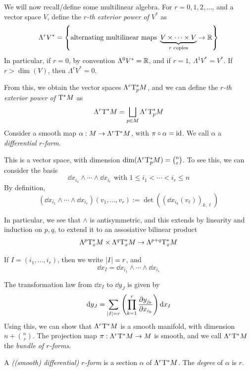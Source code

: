 \documentclass{article}
\begin{document}
We will now recall/define some multilinear algebra. For \(r = 0,1, 2, \dots\), and a vector space \(V\), define the \emph{\(r\)-th exterior power of \(V^*\)} as
\[\Lambda^rV^* = \left\{\text{alternating multilinear maps }\underbrace{V \times \cdots \times V}_{r \text{ copies}} \to \mathbb{R}\right\}\]
In particular, if \(r = 0\), by convention \(\Lambda^0V^* = \mathbb{R}\), and if \(r = 1\), \(\Lambda^1V^* = V^*\). If \(r > \dim(V)\), then \(\Lambda^rV^* = 0\). 

From this, we obtain the vector spaces \(\Lambda^r\mathrm{T}_p^* M\), and we can define the \emph{\(r\)-th exterior power of \(\mathrm{T}^*M\)} as
\[\Lambda^r\mathrm{T}^* M = \bigsqcup_{p \in M}\Lambda^r\mathrm{T}_p^* M\]
Consider a smooth map \(\alpha : M \to \Lambda^r\mathrm{T}^*M\), with \(\pi \circ \alpha = \operatorname{id}\). We call \(\alpha\) a \emph{differential \(r\)-form}.

\lec

This is a vector space, with dimension \(\dim(\Lambda^r\mathrm{T}_p^* M) = {n \choose r}\). To see this, we can consider the basis
\[\dd x_{i_1} \wedge \cdots \wedge \dd x_{i_r} \text{ with }1 \le i_1 < \cdots < i_r \le n\]
By definition,
\[(\dd x_{i_1} \wedge \cdots \wedge \dd x_{i_r})(v_1, \dots, v_r) := \det((\dd x_{i_k}(v_\ell))_{k, \ell})\]

In particular, we see that \(\wedge\) is antisymmetric, and this extends by linearity and induction on \(p, q\), to extend it to an assosiative bilinear product
\[\Lambda^p \mathrm{T}_x^*M \times \Lambda^q \mathrm{T}_x^* M \to \Lambda^{p+q}\mathrm{T}_x^* M\]

\begin{notation}
     If \(I = (i_1, \dots, i_r)\), then we write \(\abs{I} = r\), and
    \[\dd x_I = \dd x_{i_1} \wedge \cdots \wedge \dd x_{i_r}\]
\end{notation}

The transformation law from \(\dd x_I\) to \(\dd y_J\) is given by
\[\dd y_J = \sum_{\abs{I} = r}\left(\prod_{k=1}^r\pdv{y_{j_k}}{x_{i_k}}\right)\dd x_I\]
Using this, we can show that \(\Lambda^r \mathrm{T}^* M\) is a smooth manifold, with dimension \(n + {n \choose r}\). The projection map \(\pi : \Lambda^r \mathrm{T}^*M \to M\) is smooth, and we call \(\Lambda^r\mathrm{T}^*M\) the \emph{bundle of \(r\)-forms}.

\begin{definition}
    A \emph{((smooth) differential) \(r\)-form} is a section \(\alpha\) of \(\Lambda^r\mathrm{T}^*M\). The \emph{degree} of \(\alpha\) is \(r\).
\end{definition}
\end{document}
